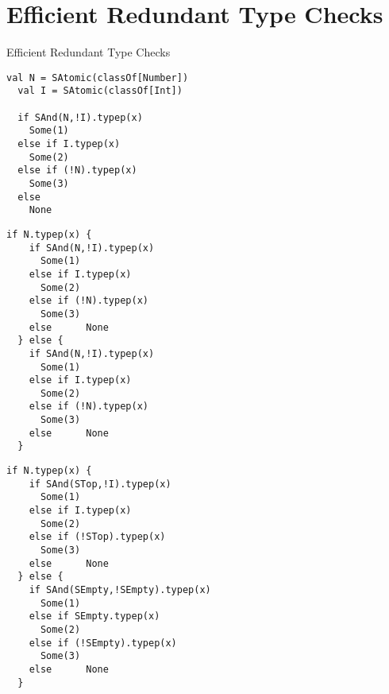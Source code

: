 \section{Efficient Redundant Type Checks}

\begin{frame}{Efficient Redundant Type Checks}
\end{frame}


\newsavebox\typecaseAbox
\begin{lrbox}{\typecaseAbox}
  \begin{minipage}{8cm}
\begin{lstlisting}[style=scalaioScala]
  val N = SAtomic(classOf[Number])
  val I = SAtomic(classOf[Int])

  if SAnd(N,!I).typep(x)
    Some(1)
  else if I.typep(x)
    Some(2)
  else if (!N).typep(x)
    Some(3)
  else
    None
\end{lstlisting}
  \end{minipage}
\end{lrbox}

\newsavebox\typecaseBbox
\begin{lrbox}{\typecaseBbox}
  \begin{minipage}{8cm}
\begin{lstlisting}[style=scalaioScala]
  if N.typep(x) {
    if SAnd(N,!I).typep(x)
      Some(1)
    else if I.typep(x)
      Some(2)
    else if (!N).typep(x)
      Some(3)
    else      None
  } else {
    if SAnd(N,!I).typep(x)
      Some(1)
    else if I.typep(x)
      Some(2)
    else if (!N).typep(x)
      Some(3)
    else      None
  }
\end{lstlisting}
  \end{minipage}
\end{lrbox}

\newsavebox\typecaseCbox
\begin{lrbox}{\typecaseCbox}
  \begin{minipage}{6cm}
\begin{lstlisting}[style=scalaioScala]
  if N.typep(x) {
    if SAnd(STop,!I).typep(x)
      Some(1)
    else if I.typep(x)
      Some(2)
    else if (!STop).typep(x)
      Some(3)
    else      None
  } else {
    if SAnd(SEmpty,!SEmpty).typep(x)
      Some(1)
    else if SEmpty.typep(x)
      Some(2)
    else if (!SEmpty).typep(x)
      Some(3)
    else      None
  }
\end{lstlisting}
  \end{minipage}
\end{lrbox}

